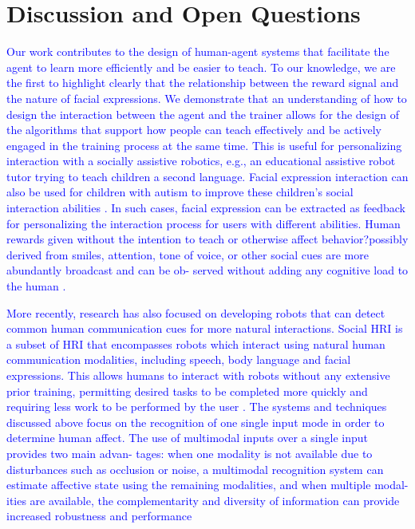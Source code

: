 \section{Discussion and Open Questions}
\label{sec:doq}



\textcolor{blue}{Our work contributes to the design of human-agent systems that facilitate the agent to learn more efficiently and be easier to teach. To our knowledge, we are the first to highlight clearly that the relationship between the reward signal and the nature of facial expressions. %
We demonstrate that an understanding of how to design the interaction between the agent and the trainer allows for the design of the algorithms that support how people can teach effectively and be actively engaged in the training process at the same time. This is useful for personalizing interaction with a socially assistive robotics, e.g., an educational assistive robot tutor \cite{gordon2016affective} trying to teach children a second language. Facial expression interaction can also be used for children with autism to improve these children's social interaction abilities \cite{pour2018human}. In such cases, facial expression can be extracted as feedback for personalizing the interaction process for users with different abilities. Human rewards given without the intention to teach or otherwise affect behavior?possibly derived from smiles, attention, tone of voice, or other social cues are more abundantly broadcast and can be ob- served without adding any cognitive load to the human \cite{knox2012learning}.} 

\textcolor{blue}{More recently, research has also focused on developing robots that can detect common human communication cues for more natural interactions. Social HRI is a subset of HRI that encompasses robots which interact using natural human communication modalities, including speech, body language and facial expressions. This allows humans to interact with robots without any extensive prior training, permitting desired tasks to be completed more quickly and requiring less work to be performed by the user \cite{mccoll2016survey}. 
The systems and techniques discussed above focus on the recognition of one single input mode in order to determine human affect. The use of multimodal inputs over a single input provides two main advan- tages: when one modality is not available due to disturbances such as occlusion or noise, a multimodal recognition system can estimate affective state using the remaining modalities, and when multiple modal- ities are available, the complementarity and diversity of information can provide increased robustness and performance}

